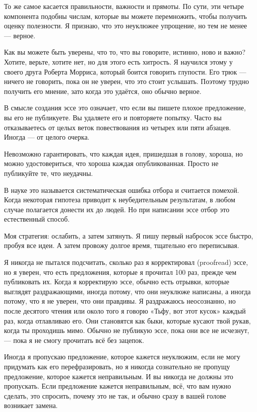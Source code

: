 \documentclass[ebook,12pt,oneside,openany]{memoir}
\begin{document}
То же самое касается правильности, важности и прямоты. По сути, эти
четыре компонента подобны числам, которые вы можете перемножить, чтобы
получить оценку полезности. Я признаю, что это неуклюжее упрощение, но
тем не менее — верное.

Как вы можете быть уверены, что то, что вы говорите, истинно, ново и
важно? Хотите, верьте, хотите нет, но для этого есть хитрость. Я
научился этому у своего друга Роберта Морриса, который боится говорить
глупости. Его трюк — ничего не говорить, пока он не уверен, что это
стоит услышать. Поэтому трудно получить его мнение, зато когда это
удаётся, оно обычно верное.

В смысле создания эссе это означает, что если вы пишете плохое
предложение, вы его не публикуете. Вы удаляете его и повторяете
попытку. Часто вы отказываетесь от целых веток повествования из
четырех или пяти абзацев. Иногда — от целого очерка.

Невозможно гарантировать, что каждая идея, пришедшая в голову, хороша,
но можно удостовериться, что хороша каждая опубликованная. Просто не
публикуйте те, что неудачны.

В науке это называется систематическая ошибка отбора и считается
помехой. Когда некоторая гипотеза приводит к неубедительным
результатам, в любом случае полагается донести их до людей. Но при
написании эссе отбор это естественный способ.

Моя стратегия: ослабить, а затем затянуть. Я пишу первый набросок эссе
быстро, пробуя все идеи. А затем провожу долгое время, тщательно его
переписывая.

Я никогда не пытался подсчитать, сколько раз я корректировал
(proofread) эссе, но я уверен, что есть предложения, которые я
прочитал 100 раз, прежде чем публиковать их. Когда я корректирую эссе,
обычно есть отрывки, которые выглядят раздражающими, иногда потому,
что они неуклюже написаны, а иногда потому, что я не уверен, что они
правдивы. Я раздражаюсь неосознанно, но после десятого чтения или
около того я говорю «Тьфу, вот этот кусок» каждый раз, когда
отлавливаю его. Они становятся как быки, которые кусают твой рукав,
когда ты проходишь мимо. Обычно не публикую эссе, пока они все не
исчезнут, — пока я не смогу прочитать всё без зацепок.

Иногда я пропускаю предложение, которое кажется неуклюжим, если не
могу придумать как его перефразировать, но я никогда сознательно не
пропущу предложение, которое кажется неправильным. И вы никогда не
должны это пропускать. Если предложение кажется неправильным, всё, что
вам нужно сделать, это спросить, почему это не так, и обычно сразу в
вашей голове возникает замена.
\end{document}
